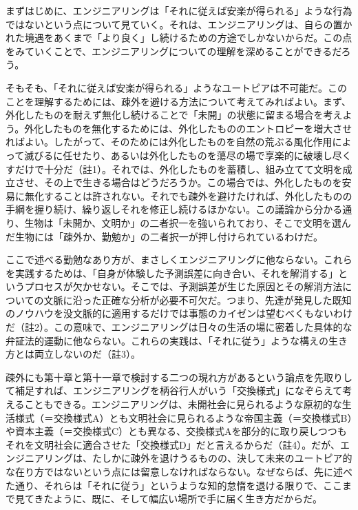 まずはじめに、エンジニアリングは「それに従えば安楽が得られる」ような行為ではないという点について見ていく。それは、エンジニアリングは、自らの置かれた境遇をあくまで「より良く」し続けるための方途でしかないからだ。この点をみていくことで、エンジニアリングについての理解を深めることができるだろう。

そもそも、「それに従えば安楽が得られる」ようなユートピアは不可能だ。このことを理解するためには、疎外を避ける方法について考えてみればよい。まず、外化したものを耐えず無化し続けることで「未開」の状態に留まる場合を考えよう。外化したものを無化するためには、外化したもののエントロピーを増大させればよい。したがって、そのためには外化したものを自然の荒ぶる風化作用によって滅びるに任せたり、あるいは外化したものを蕩尽の場で享楽的に破壊し尽くすだけで十分だ（註1）。それでは、外化したものを蓄積し、組み立てて文明を成立させ、その上で生きる場合はどうだろうか。この場合では、外化したものを安易に無化することは許されない。それでも疎外を避けたければ、外化したものの手綱を握り続け、繰り返しそれを修正し続けるほかない。この議論から分かる通り、生物は「未開か、文明か」の二者択一を強いられており、そこで文明を選んだ生物には「疎外か、勤勉か」の二者択一が押し付けられているわけだ。

ここで述べる勤勉なあり方が、まさしくエンジニアリングに他ならない。これらを実践するためは、「自身が体験した予測誤差に向き合い、それを解消する」というプロセスが欠かせない。そこでは、予測誤差が生じた原因とその解消方法についての文脈に沿った正確な分析が必要不可欠だ。つまり、先達が発見した既知のノウハウを没文脈的に適用するだけでは事態のカイゼンは望むべくもないわけだ（註2）。この意味で、エンジニアリングは日々の生活の場に密着した具体的な弁証法的運動に他ならない。これらの実践は、「それに従う」ような構えの生き方とは両立しないのだ（註3）。

疎外にも第十章と第十一章で検討する二つの現れ方があるという論点を先取りして補足すれば、エンジニアリングを柄谷行人がいう「交換様式」になぞらえて考えることもできる。エンジニアリングは、未開社会に見られるような原初的な生活様式（＝交換様式A）とも文明社会に見られるような帝国主義（＝交換様式B）や資本主義（＝交換様式C）とも異なる、交換様式Aを部分的に取り戻しつつもそれを文明社会に適合させた「交換様式D」だと言えるからだ（註4）。だが、エンジニアリングは、たしかに疎外を退けうるものの、決して未来のユートピア的な在り方ではないという点には留意しなければならない。なぜならば、先に述べた通り、それらは「それに従う」というような知的怠惰を退ける限りで、ここまで見てきたように、既に、そして幅広い場所で手に届く生き方だからだ。

